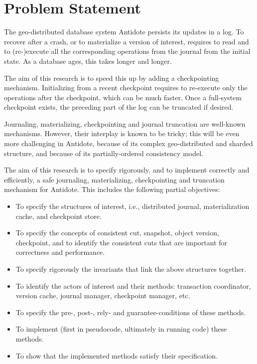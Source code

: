 \documentclass[twoside]{article}
\begin{document}
\makeRR   %

\section{Problem Statement}
\label{sec:problem-statement}
The geo-distributed database system Antidote persists its
updates in a log.
To recover after a crash, or to materialize a version of interest,
requires to read and to (re-)execute all the corresponding operations
from the journal from the initial state.
As a database ages, this takes longer and longer.

The aim of this research is to speed this up by adding a checkpointing
mechanism.
Initializing from a recent checkpoint requires to re-execute only
the operations after the checkpoint, which can be much faster.
Once a full-system checkpoint exists, the preceding part of the log can
be truncated if desired.

Journaling, materializing, checkpointing and journal truncation are
well-known mechanisms.
However, their interplay is known to be tricky; this will be even more
challenging in Antidote, because of its complex geo-distributed and
sharded structure, and because of its partially-ordered consistency
model.

The aim of this research is to specify rigorously, and to implement
correctly and efficiently, a safe journaling, materializing,
checkpointing and truncation mechanism for Antidote.
This includes the following partial objectives:
\begin{itemize}
\item
  To specify the structures of interest, i.e., distributed journal,
  materialization cache, and checkpoint store.
\item
  To specify the concepts of consistent cut, snapshot, object version,
  checkpoint, and to identify the consistent cuts that are important for
  correctness and performance.
\item
  To specify rigorously the invariants that link the above structures
  together.
\item
  To identify the actors of interest and their methods: transaction
  coordinator, version cache, journal manager, checkpoint manager, etc.
\item
  To specify the pre-, post-, rely- and guarantee-conditions of these
  methods.
\item
  To implement (first in pseudocode, ultimately in running code) these
  methods.
\item
  To show that the implemented methods satisfy their specification.
\end{itemize}
\end{document}
